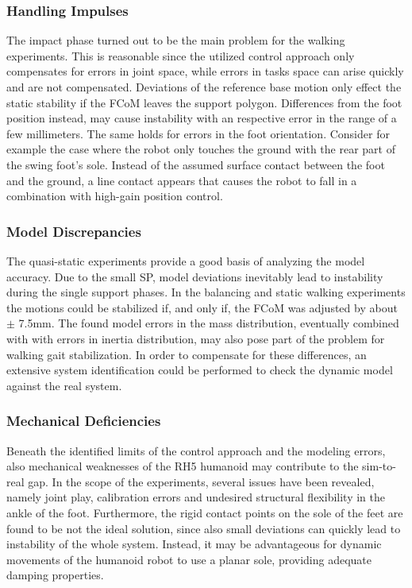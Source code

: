 \subsubsection{Handling Impulses}
The impact phase turned out to be the main problem for the walking experiments. This is reasonable since the utilized control approach only compensates for errors in joint space, while errors in tasks space can arise quickly and are not compensated. Deviations of the reference base motion only effect the static stability if the \gls{FCoM} leaves the support polygon. Differences from the foot position instead, may cause instability with an respective error in the range of a few millimeters. The same holds for errors in the foot orientation. Consider for example the case where the robot only touches the ground with the rear part of the swing foot's sole. Instead of the assumed surface contact between the foot and the ground, a line contact appears that causes the robot to fall in a combination with high-gain position control. 
\subsubsection{Model Discrepancies}
The quasi-static experiments provide a good basis of analyzing the model accuracy. Due to the small \gls{SP}, model deviations inevitably lead to instability during the single support phases. In the balancing and static walking experiments the motions could be stabilized if, and only if, the \gls{FCoM} was adjusted by about $\pm$ 7.5mm. The found model errors in the mass distribution, eventually combined with with errors in inertia distribution, may also pose part of the problem for walking gait stabilization. In order to compensate for these differences, an extensive system identification could be performed to check the dynamic model against the real system.
\subsubsection{Mechanical Deficiencies}
Beneath the identified limits of the control approach and the modeling errors, also mechanical weaknesses of the RH5 humanoid may contribute to the sim-to-real gap. In the scope of the experiments, several issues have been revealed, namely joint play, calibration errors and undesired structural flexibility in the ankle of the foot. Furthermore, the rigid contact points on the sole of the feet are found to be not the ideal solution, since also small deviations can quickly lead to instability of the whole system. Instead, it may be advantageous for dynamic movements of the humanoid robot to use a planar sole, providing adequate damping properties. 


























